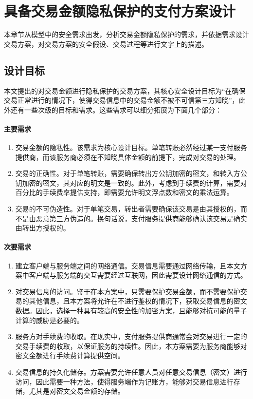 \chapter{具备交易金额隐私保护的支付方案设计}

本章节从模型中的安全需求出发，分析交易金额隐私保护的需求，并依据需求设计交易方案，对交易方案的安全假设、交易过程等进行文字上的描述。

\section{设计目标}

本文提出的对交易金额进行隐私保护的交易方案，其核心安全设计目标为“在确保交易正常进行的情况下，使得交易信息中的交易金额不被不可信第三方知晓”，此外还有一些次级的目标和需求。这些需求可以细分拓展为下面几个部分：

\subsubsection*{主要需求}
\begin{enumerate} 
    \item 交易金额的隐私性。该需求为核心设计目标。单笔转账必然经过某一支付服务提供商，而该服务商必须在不知晓具体金额的前提下，完成对交易的处理。
    \item 交易的正确性。对于单笔转账，需要确保转出方公钥加密的密文，和转入方公钥加密的密文，其对应的明文是一致的。此外，考虑到手续费的计算，需要对百分比的手续费率提供支持，即需要允许明文浮点数和密文的乘法运算。
    \item 交易的不可伪造性。对于单笔交易，转出者需要确保该交易是由其授权的，而不是由恶意第三方伪造的。换句话说，支付服务提供商能够确认该交易是确实由转出方授权的。
\end{enumerate}

\subsubsection*{次要需求}
\begin{enumerate}
    \item 建立客户端与服务端之间的网络通信。交易信息需要通过网络传输，且本文方案中客户端与服务端的交互需要经过互联网，因此需要设计网络通信的方式。
    \item 对交易信息的访问。鉴于在本方案中，只需要保护交易金额，而不需要保护交易的其他信息，且本方案将允许在不进行鉴权的情况下，获取交易信息的密文数据。因此，选择一种具有较高的安全性的加密方案，且能够对抗可能的量子计算的威胁是必要的。
    \item 服务方对手续费的收取。在现实中，支付服务提供商通常会对交易进行一定的交易手续费的收取，以保证服务的持续性。因此，本方案需要为服务商能够对密文金额进行手续费计算提供空间。
    \item 交易信息的持久化储存。方案需要允许任意人员对任意交易信息（密文）进行访问，因此需要一种方法，使得服务端作为记账方，能够对交易信息进行存储，尤其是对密文交易金额的存储。
\end{enumerate}


